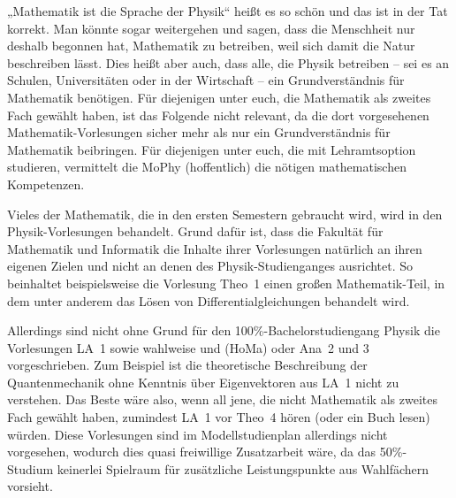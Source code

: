 „Mathematik ist die Sprache der Physik“ heißt es so schön und das ist in der Tat korrekt. Man könnte sogar weitergehen und sagen, dass die Menschheit nur deshalb begonnen hat, Mathematik zu betreiben, weil sich damit die Natur beschreiben lässt. Dies heißt aber auch, dass alle, die Physik betreiben -- sei es an Schulen, Universitäten oder in der Wirtschaft -- ein Grundverständnis für Mathematik benötigen. Für diejenigen unter euch, die Mathematik als zweites Fach gewählt haben, ist das Folgende nicht relevant, da die dort vorgesehenen Mathematik-Vorlesungen sicher mehr als nur ein Grundverständnis für Mathematik beibringen. Für diejenigen unter euch, die mit Lehramtsoption studieren, vermittelt die MoPhy (hoffentlich) die nötigen mathematischen Kompetenzen.

Vieles der Mathematik, die in den ersten Semestern gebraucht wird, wird in den Physik-Vorlesungen behandelt. Grund dafür ist, dass die Fakultät für Mathematik und Informatik die Inhalte ihrer Vorlesungen natürlich an ihren eigenen Zielen und nicht an denen des Physik-Studienganges ausrichtet. So beinhaltet beispielsweise die Vorlesung \gls{Theo}~1 einen großen Mathematik-Teil, in dem unter anderem das Lösen von Differentialgleichungen behandelt wird.

Allerdings sind nicht ohne Grund für den 100\%-Bachelorstudiengang Physik die Vorlesungen \gls{LA}~1 sowie wahlweise  und  (\gls{HoMa}) oder \gls{Ana}~2 und 3 vorgeschrieben. Zum Beispiel ist die theoretische Beschreibung der Quantenmechanik ohne Kenntnis über Eigenvektoren aus \gls{LA}~1 nicht zu verstehen. Das Beste wäre also, wenn all jene, die nicht Mathematik als zweites Fach gewählt haben, zumindest \gls{LA}~1 vor \gls{Theo}~4 hören (oder ein Buch lesen) würden. Diese Vorlesungen sind im Modellstudienplan allerdings nicht vorgesehen, wodurch dies quasi freiwillige Zusatzarbeit wäre, da das 50\%-Studium keinerlei Spielraum für zusätzliche Leistungspunkte aus Wahlfächern vorsieht.
